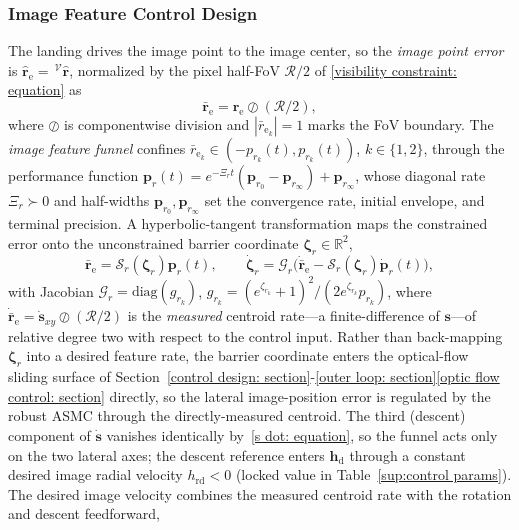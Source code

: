 \documentclass{IEEEtaes}
\begin{document}
\subsubsection{Image Feature Control Design} \label{image point control: section}
The landing drives the image point to the image center, so the \emph{image point error} is $\hat{\boldsymbol{r}}_\text{e}=\,^\mathcal{V}\hat{\boldsymbol{r}}$, normalized by the pixel half-FoV $\mathcal{R}/2$ of \eqref{visibility constraint: equation} as
\begin{equation} \label{normalized error: equation}
    \bar{\boldsymbol{r}}_\text{e} = \hat{\boldsymbol{r}}_\text{e}\oslash(\mathcal{R}/2),
\end{equation}
where $\oslash$ is componentwise division and $|\bar{r}_{\text{e}_k}|=1$ marks the FoV boundary. The \emph{image feature funnel} confines $\bar{r}_{\text{e}_k}\in(-p_{r_k}(t),p_{r_k}(t))$, $k\in\{1,2\}$, through the performance function $\boldsymbol{p}_r(t)=e^{-\Xi_r t}(\boldsymbol{p}_{r_0}-\boldsymbol{p}_{r_\infty})+\boldsymbol{p}_{r_\infty}$, whose diagonal rate $\Xi_r\succ 0$ and half-widths $\boldsymbol{p}_{r_0},\boldsymbol{p}_{r_\infty}$ set the convergence rate, initial envelope, and terminal precision. A hyperbolic-tangent transformation maps the constrained error onto the unconstrained barrier coordinate $\boldsymbol{\zeta}_r\in\mathbb{R}^2$,
\begin{equation} \label{image funnel transform: equation}
    \bar{\boldsymbol{r}}_\text{e}=\mathcal{S}_r(\boldsymbol{\zeta}_r)\boldsymbol{p}_r(t),\qquad \dot{\boldsymbol{\zeta}}_r=\mathcal{G}_r\big(\dot{\bar{\boldsymbol{r}}}_\text{e}-\mathcal{S}_r(\boldsymbol{\zeta}_r)\dot{\boldsymbol{p}}_r(t)\big),
\end{equation}
with Jacobian $\mathcal{G}_r=\mathrm{diag}(g_{r_k})$, $g_{r_k}=(e^{\zeta_{r_k}}+1)^2/(2e^{\zeta_{r_k}}p_{r_k})$, where $\dot{\bar{\boldsymbol{r}}}_\text{e}=\dot{\boldsymbol{s}}_{xy}\oslash(\mathcal{R}/2)$ is the \emph{measured} centroid rate---a finite-difference of $\boldsymbol{s}$---of relative degree two with respect to the control input. Rather than back-mapping $\boldsymbol{\zeta}_r$ into a desired feature rate, the barrier coordinate enters the optical-flow sliding surface of Section~\ref{control design: section}-\ref{outer loop: section}\ref{optic flow control: section} directly, so the lateral image-position error is regulated by the robust ASMC through the directly-measured centroid. The third (descent) component of $\dot{\boldsymbol{s}}$ vanishes identically by~\eqref{s dot: equation}, so the funnel acts only on the two lateral axes; the descent reference enters $\boldsymbol{h}_\text{d}$ through a constant desired image radial velocity $h_\text{rd}<0$ (locked value in Table~\ref{sup:control params}). The desired image velocity combines the measured centroid rate with the rotation and descent feedforward,
\end{document}
